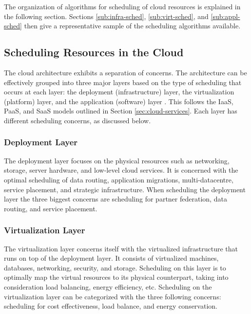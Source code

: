 \documentclass[12pt]{article}
\begin{document}
The organization of algorithms for scheduling of cloud resources is explained in the following section. Sections \ref{sub:infra-sched}, \ref{sub:virt-sched}, and \ref{sub:appl-sched} then give a representative sample of the scheduling algorithms available.



\subsection{Scheduling Resources in the Cloud}

The cloud architecture exhibits a separation of concerns.  The architecture can be effectively grouped into three major layers based on the type of scheduling that occurs at each layer: the deployment (infrastructure) layer, the virtualization (platform) layer, and the application (software) layer \cite{zhan2015cloud}. This follows the IaaS, PaaS, and SaaS models outlined in Section \ref{sec:cloud-services}. Each layer has different scheduling concerns, as discussed below.


\subsubsection{Deployment Layer}

The deployment layer focuses on the physical resources such as networking, storage, server hardware, and low-level cloud services. It is concerned with the optimal scheduling of data routing, application migrations, multi-datacentre, service placement, and strategic infrastructure. When scheduling the deployment layer the three biggest concerns are scheduling for partner federation, data routing, and service placement.



\subsubsection{Virtualization Layer}

The virtualization layer concerns itself with the virtualized infrastructure that runs on top of the deployment layer. It consists of virtualized machines, databases, networking, security, and storage. Scheduling on this layer is to optimally map the virtual resources to its physical counterpart, taking into consideration load balancing, energy efficiency, etc. Scheduling on the virtualization layer can be categorized with the three following concerns: scheduling for cost effectiveness, load balance, and energy conservation.
\end{document}
